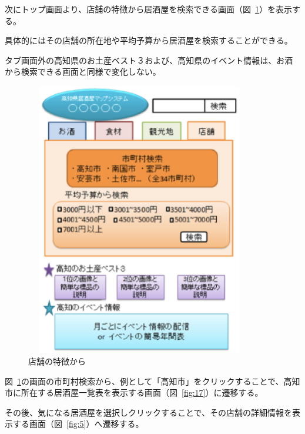 次にトップ画面より、店舗の特徴から居酒屋を検索できる画面（図~\ref{fig:16}）を表示する。



具体的にはその店舗の所在地や平均予算から居酒屋を検索することができる。



タブ画面外の高知県のお土産ベスト３および、高知県のイベント情報は、お酒から検索できる画面と同様で変化しない。
\clearpage
\begin {figure}[!htbp]
    \begin{center}
    \includegraphics [height=12cm, width=10cm]{16.eps}
    \caption {店舗の特徴から}
    \label {fig:16}
    \end{center}
\end {figure}



図~\ref{fig:16}の画面の市町村検索から、例として「高知市」をクリックすることで、高知市に所在する居酒屋一覧表を表示する画面（図~\ref{fig:17}）に遷移する。



その後、気になる居酒屋を選択しクリックすることで、その店舗の詳細情報を表示する画面（図~\ref{fig:5}）へ遷移する。
\clearpage

